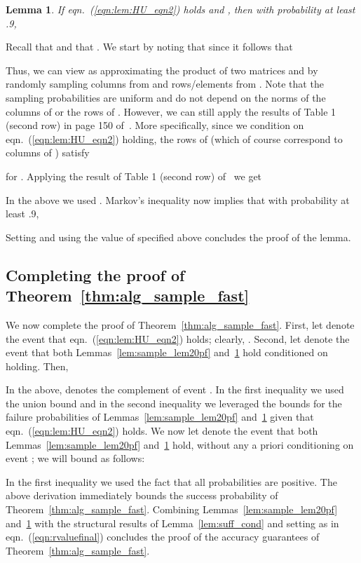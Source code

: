\documentclass[11pt]{article}
\newtheorem{lemma}{Lemma}
\newenvironment{Proof}{\noindent {\em Proof:}}{\\\hspace*{\fill}\mbox{}}
\begin{document}
\begin{lemma}
\label{lem:sample_lem40pf}
If eqn.~(\ref{eqn:lem:HU_eqn2}) holds and , then with probability at least .9,

\end{lemma}
\begin{Proof}
Recall that  and that . We start by noting that since
 it follows that

Thus, we can view  as approximating the product of two matrices  and  by randomly sampling columns from  and rows/elements from . Note that the sampling probabilities are uniform and do not depend on the norms of the columns of  or the rows of . However, we can still apply the results of Table 1 (second row) in page 150 of~\cite{dkm_matrix1}. More specifically, since we condition on eqn.~(\ref{eqn:lem:HU_eqn2}) holding, the rows of  (which of course correspond to columns of ) satisfy

for . Applying the result of Table 1 (second row) of~\cite{dkm_matrix1} we get

In the above we used . Markov's inequality now implies that with probability at least .9,

Setting  and using the value of  specified above concludes the proof of the lemma.
\end{Proof}

\subsection{Completing the proof of Theorem~\ref{thm:alg_sample_fast}}
\label{sxn:sampling:proofs:complete}

We now complete the proof of Theorem~\ref{thm:alg_sample_fast}. First, let  denote the event that eqn.~(\ref{eqn:lem:HU_eqn2}) holds; clearly, . Second, let  denote the event that both Lemmas~\ref{lem:sample_lem20pf} and~\ref{lem:sample_lem40pf} hold conditioned on  holding. Then,

In the above,  denotes the complement of event . In the first inequality we used the union bound and in the second inequality we leveraged the bounds for the failure probabilities of Lemmas~\ref{lem:sample_lem20pf} and~\ref{lem:sample_lem40pf} given that eqn.~(\ref{eqn:lem:HU_eqn2}) holds. We now let  denote the event that both Lemmas~\ref{lem:sample_lem20pf} and~\ref{lem:sample_lem40pf} hold, without any a priori conditioning on event ; we will bound  as follows:

In the first inequality we used the fact that all probabilities are positive. The above derivation immediately bounds the success probability of Theorem~\ref{thm:alg_sample_fast}. Combining Lemmas~\ref{lem:sample_lem20pf} and~\ref{lem:sample_lem40pf} with the structural results of Lemma~\ref{lem:suff_cond} and setting  as in eqn.~(\ref{eqn:rvaluefinal}) concludes the proof of the accuracy guarantees of Theorem~\ref{thm:alg_sample_fast}.
\end{document}
